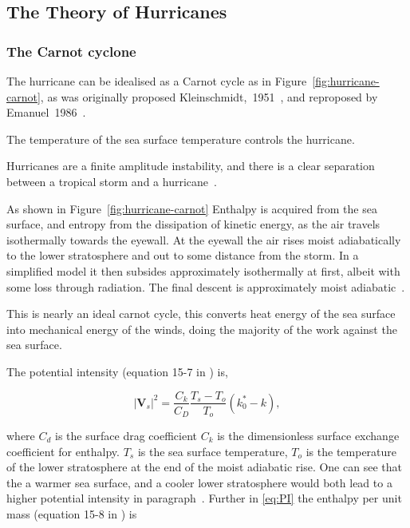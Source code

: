 
\subsection{The Theory of Hurricanes}
\label{sec:hurr-theory}
\subsubsection{The Carnot cyclone}
\label{sec:carnot}

The hurricane can be idealised as a Carnot cycle as in Figure~\ref{fig:hurricane-carnot},
as was originally proposed Kleinschmidt,~1951~\cite{kleinschmidt1951grundlagen},
and reproposed by Emanuel~1986~\cite{emanuel1986air, emanuel1987dependence, lilly1985steady,}.



The temperature of the sea surface temperature controls the hurricane\cite{emanuel1991theory, emanuel2018progress}.



Hurricanes are a finite amplitude instability, and there is a
clear separation between a tropical storm and a hurricane~\cite{emanuel2005divine}.

As shown in Figure~\ref{fig:hurricane-carnot} Enthalpy is acquired from the sea surface,
and entropy from the dissipation of kinetic energy,
 as the air travels isothermally towards the eyewall.
 At the eyewall the air rises moist adiabatically
 to the lower stratosphere and out to some distance from the storm.
 In a simplified model it then subsides
 approximately isothermally at first, albeit with some loss through radiation.
 The final descent is approximately moist adiabatic~\cite{emanuel2018progress}.

This is nearly an ideal carnot cycle, this converts heat energy of the sea surface into
mechanical energy of the winds, doing the majority of the work against the sea surface.

The potential intensity (equation 15-7 in \cite{emanuel2018progress}) is,

\begin{equation}
\left|\mathbf{V}_{s}\right|^{2}=\frac{C_{k}}{C_{D}} \frac{T_{s}-T_{o}}{T_{o}}\left(k_{0}^{*}-k\right),
\tag{PI}
\label{eq:PI}
\end{equation}

where $C_d$ is the surface drag coefficient $C_k$ is the dimensionless
surface exchange coefficient for enthalpy.
$T_s$ is the sea surface temperature, $T_o$ is the temperature of the
lower stratosphere at the end of the moist adiabatic rise.
One can see that the a warmer sea surface, and a cooler lower stratosphere
would both lead to a higher potential intensity in paragraph~\cite{emanuel1991theory}.
Further in \ref{eq:PI} the enthalpy per unit mass (equation 15-8 in \cite{emanuel2018progress}) is

